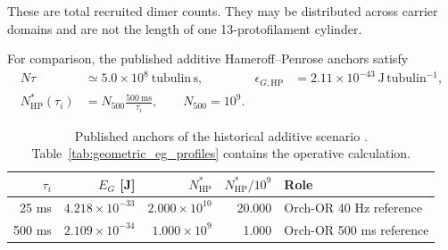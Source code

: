 \begin{table}[H]
\centering
\scriptsize
{}
\caption{Finite-profile saturation from Eq.~\eqref{eq:geometric_eg_discrete} and
stationary carrier counts $N_G^*=\hbar/(\tau e_G)$. The two rows bracket the
profile-width interpretation without fitting the result to an Orch-OR interval; the
$\infty$ columns give the smallest counts available from each finite profile.}
\label{tab:geometric_eg_profiles}
\end{table}

\noindent These are total recruited dimer counts. They may be distributed across
carrier domains and are not the length of one 13-protofilament cylinder.

For comparison, the published additive Hameroff--Penrose anchors satisfy
\begin{equation}
\begin{aligned}
  N\tau&\simeq5.0\times10^8\ \mathrm{tubulin\,s},
  &\epsilon_{G,\mathrm{HP}}&=2.11\times10^{-43}\ \mathrm{J\,tubulin^{-1}},\\
  N_{\mathrm{HP}}^*(\tau_i)
  &=N_{500}\frac{500\ \mathrm{ms}}{\tau_i},
  \qquad N_{500}=10^9.
\end{aligned}
  \label{eq:hp_anchor_scaling}
\end{equation}

\begin{table}[H]
\centering
\footnotesize
\begin{tabular}{@{}rrrrp{4.0cm}@{}}
\toprule
$\tau_i$ & $E_G$ [J] & $N_{\mathrm{HP}}^*$ & $N_{\mathrm{HP}}^*/10^9$ & Role \\
\midrule
25 ms  & $4.218\times10^{-33}$ & $2.000\times10^{10}$ & 20.000 & Orch-OR 40 Hz reference \\
500 ms & $2.109\times10^{-34}$ & $1.000\times10^9$  & 1.000  & Orch-OR 500 ms reference \\
\bottomrule
\end{tabular}
\caption{Published anchors of the historical additive scenario
\citep{hameroff2014}. Table~\ref{tab:geometric_eg_profiles} contains the operative
calculation.}
\label{tab:historical_hp_anchors}
\end{table}

